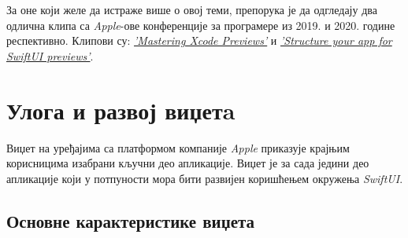 \documentclass[12pt,oneside]{memoir}
\begin{document}
\indent За оне који желе да истраже више о овој теми, препорука је да одгледају два одлична клипа са \textit{Apple}-ове конференције за програмере из 2019. и 2020. године респективно. Клипови су: \href{https://developer.apple.com/videos/play/wwdc2019/233/}{\textit{'Mastering Xcode Previews'}} и \href{https://developer.apple.com/videos/play/wwdc2020/10149/}{\textit{'Structure your app for SwiftUI previews'}}.

\chapter{Улога и развој виџетa}

\indent Виџет на уређајима са платформом компаније \textit{Apple} приказује крајњим корисницима изабрани кључни део апликације. Виџет је за сада једини део апликације који у потпуности мора бити развијен коришћењем окружења \textit{SwiftUI}.

\section{Основне карактеристике виџета}
\end{document}
